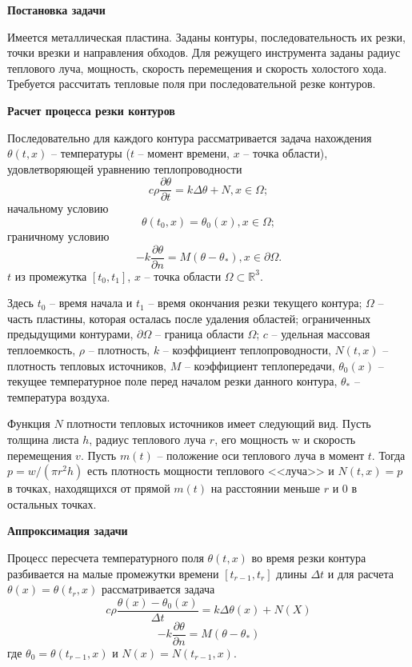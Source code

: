 \documentclass[11pt,twoside,openany]{report}
\begin{document}
{\bf Постановка задачи}

Имеется металлическая пластина.
Заданы контуры, последовательность их резки,
точки врезки и направления обходов.
Для режущего инструмента заданы радиус теплового луча,
мощность, скорость перемещения и скорость холостого хода.
Требуется рассчитать тепловые поля при
последовательной резке контуров.

{\bf Расчет процесса резки контуров}

Последовательно для каждого контура рассматривается задача нахождения
$\theta(t, x)$ -- температуры
($t$ -- момент времени,
$x$ -- точка области),
удовлетворяющей уравнению теплопроводности
\begin{equation}
  c \rho \frac{\partial \theta}{\partial t}=k \Delta \theta +N, x \in \Omega
  ;
\end{equation}
начальному условию
\begin{equation}
  \theta(t_0, x)=\theta_0(x), x \in \Omega
  ;
\end{equation}
граничному условию
\begin{equation}
  -k \frac{\partial \theta}{\partial n}=M(\theta - \theta_*), x \in \partial \Omega
  .
\end{equation}
$t$ из промежутка $[t_0, t_1]$,
$x$ -- точка области
$\Omega \subset \mathbb R^3$.

Здесь
$t_0$ -- время начала и
$t_1$ -- время окончания резки текущего контура;
$\Omega$ -- часть пластины, которая осталась после удаления областей;
ограниченных предыдущими контурами,
$\partial \Omega$ -- граница области $\Omega$;
$c$ -- удельная массовая теплоемкость,
$\rho$ -- плотность,
$k$ -- коэффициент теплопроводности,
$N(t,x)$ -- плотность тепловых источников,
$M$ -- коэффициент теплопередачи,
$\theta_0(x)$ -- текущее температурное поле перед началом резки данного контура,
$\theta_*$ -- температура воздуха.

Функция $N$ плотности тепловых источников имеет следующий вид.
Пусть толщина листа  $h$,
радиус теплового луча $r$,
его мощность w и скорость перемещения $v$.
Пусть  $m(t)$ -- положение оси теплового луча
в момент $t$.
Тогда
$p=w/(\pi r^2 h)$
есть
плотность мощности теплового <<луча>> и
$N(t,x)=p$
в точках, находящихся от прямой $m(t)$
на расстоянии меньше $r$  и
$0$ в остальных точках.

{\bf Аппроксимация задачи}

Процесс пересчета температурного поля
$\theta(t, x)$
во время резки контура
разбивается на малые промежутки времени
$[t_{r-1}, t_r]$
длины  $\Delta t$
и для расчета
$\theta(x)=\theta(t_r, x)$
рассматривается задача
\begin{equation}
c \rho \frac{\theta(x)-\theta_0(x)}{\Delta t}=k \Delta \theta(x) + N(X)
\end{equation}
\begin{equation}
  -k \frac{\partial \theta}{\partial n}=M(\theta - \theta_*)
\end{equation}
где
$\theta_0=\theta(t_{r-1}, x)$
и
$N(x)=N(t_{r-1},x)$.
\end{document}

